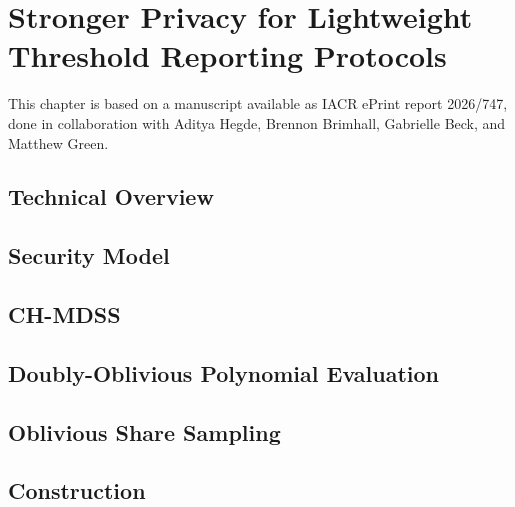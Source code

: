\chapter{Stronger Privacy for Lightweight Threshold Reporting Protocols}
\label{chap:star}

\begin{singlespace}

	This chapter is based on a manuscript available as IACR ePrint report 2026/747, done in collaboration with Aditya Hegde, Brennon Brimhall, Gabrielle Beck, and Matthew Green.

\end{singlespace}

% 

\section{Technical Overview}


\section{Security Model}


\section{CH-MDSS}
\label{sec:chmdss}


\section{Doubly-Oblivious Polynomial Evaluation}
\label{sec:star-dope}


\section{Oblivious Share Sampling}


\section{Construction}


